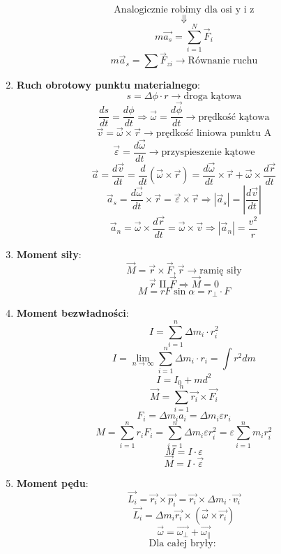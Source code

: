\documentclass{article}
\begin{document}
\begin{enumerate}
\[		\]
		\[
		\text{Analogicznie robimy dla osi y i z}
		\]
		\[
		\Downarrow
		\]
		\[
		m \overrightarrow{a_s} = \sum\limits_{i = 1}^N \vec{F}_i
		\]
		\[
		m \vec{a}_s = \sum\vec{F}_{zi} \longrightarrow \text{Równanie ruchu}
		\]
		\item \textbf{Ruch obrotowy punktu materialnego}:
		\[
		s = \Delta\phi \cdot r \longrightarrow \text{droga kątowa}
		\]
		\[
		\frac{ds}{dt} = \frac{d \phi}{dt}
		\Rightarrow
		\vec{\omega} = \frac{d \vec{\phi}}{dt} \longrightarrow \text{prędkość kątowa}
		\]
		\[
		\vec{v} = \vec{\omega} \times \vec{r} \longrightarrow \text{prędkość liniowa punktu A}
		\]
		\[
		\vec{\varepsilon} = \frac{d \vec{\omega}}{dt} \longrightarrow \text{przyspieszenie kątowe}
		\]
		\[
		\vec{a} = \frac{d \vec{v}}{dt} = \frac{d}{dt} (\vec{\omega} \times \vec{r}) =
		\frac{d \vec{\omega}}{dt} \times \vec{r} + \vec{\omega} \times \frac{d \vec{r}}{dt}
		\]
		\[
		\vec{a}_s = \frac{d \vec{\omega}}{dt} \times \vec{r} = \vec{\varepsilon} \times \vec{r} \Rightarrow | \vec{a}_s | = \left| \frac{d \vec{v}}{dt} \right|
		\]
		\[
		\vec{a}_n = \vec{\omega} \times \frac{d \vec{r}}{dt} = \vec{\omega} \times \vec{v} \Rightarrow | \vec{a}_n | = \frac{v^2}{r}
		\]
		\item \textbf{Moment siły}:
		\[
		\vec{M} = \vec{r} \times \vec{F}, \vec{r} \longrightarrow \text{ramię siły}
		\]
		\[
		\vec{r} \text{ II } \vec{F} \Rightarrow \vec{M} = 0		
		\]
		\[
		M = rF\sin\alpha = r_{\perp} \cdot F
		\]
		\item \textbf{Moment bezwładności}:
		\[
		I = \sum\limits_{i = 1}^n \Delta m_i \cdot r^2_i
		\]
		\[
		I = \lim\limits_{n \rightarrow \infty} \sum\limits_{i = 1}^n \Delta m_i \cdot r_i = \int r^2 dm
		\]
		\[
		I = I_0 + md^2
		\]
		\[
		\vec{M} = \sum\limits_{i = 1}^n \vec{r_i} \times \vec{F_i}
		\]
		\[
		F_i = \Delta m_i a_i = \Delta m_i \varepsilon r_i
		\]
		\[
		M = \sum\limits_{i = 1}^n r_i F_i = \sum\limits_{i = 1}^n \Delta m_i \varepsilon r_i^2 = \varepsilon \sum\limits_{i = 1}^n m_i r_i^2
		\]
		\[
		M = I \cdot \varepsilon
		\]
		\[
		\vec{M} = I \cdot \vec{\varepsilon}
		\]
		\item \textbf{Moment pędu}:
		\[
		\vec{L_i} = \vec{r_i} \times \vec{p_i} = \vec{r_i} \times \Delta m_i \cdot \vec{v_i}
		\]
		\[
		\vec{L_i} = \Delta m_i \vec{r_i} \times (\vec{\omega} \times \vec{r_i})
		\]
		\[
		\vec{\omega} = \vec{\omega_{\perp}} + \vec{\omega_{\parallel}}
		\]
		\[
		\text{Dla całej bryły: }
\]
\end{enumerate}
\end{document}
